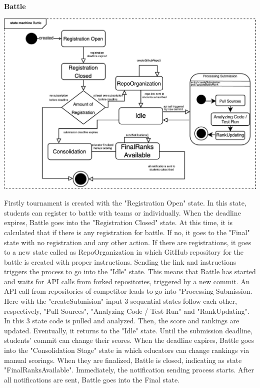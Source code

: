 \textbf{Battle}\newline
\begin{center}
    \includegraphics[scale=0.2]{Images/battleStatechart.jpeg}
\end{center}
Firstly tournament is created with the "Registration Open" state. In this state, students can register to battle with teams or individually. When the deadline expires, Battle goes into the "Registration Closed" state. At this time, it is calculated that if there is any registration for battle. If no, it goes to the "Final" state with no registration and any other action. If there are registrations, it goes to a new state called as RepoOrganization in which GitHub repository for the battle is created with proper instructions. Sending the link and instructions triggers the process to go into the "Idle" state. This means that Battle has started and waits for API calls from forked repositories, triggered by a new commit. An API call from repositories of competitor leads to go into "Processing Submission. Here with the "createSubmision" input 3 sequential states follow each other, respectively, "Pull Sources", "Analyzing Code / Test Run" and "RankUpdating". In this 3 state code is pulled and analyzed. Then, the score and rankings are updated.  Eventually, it returns to the "Idle" state. Until the submission deadline, students' commit can change their scores. When the deadline expires, Battle goes into the "Consolidation Stage" state in which educators can change rankings via manual scorings. When they are finalized, Battle is closed, indicating as state "FinalRanksAvailable". Immediately, the notification sending process starts. After all notifications are sent, Battle goes into the Final state.
\newpage
